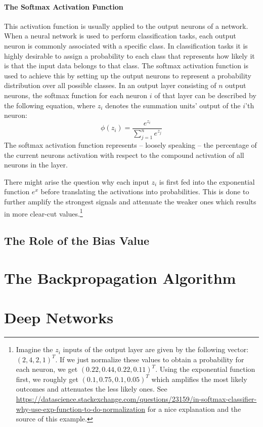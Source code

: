 \paragraph{The Softmax Activation Function}
This activation function is usually applied to the output neurons of
a network. When a neural network is used to perform classification
tasks, each output neuron is commonly associated with a specific
class. In classification tasks it is highly desirable to assign a
probability to each class that represents how likely it is that the
input data belongs to that class. The softmax activation function is
used to achieve this by setting up the output neurons to represent a
probability distribution over all possible classes.
In an output layer consisting of \(n\) output neurons, the softmax
function for each neuron \(i\) of that layer can be described by the
following equation, where \(z_i\) denotes the summation units' output of
the \(i\)'th neuron:
\begin{equation}
  \phi(z_i) = \frac{e^{z_i}}{\sum_{j=1}^{n}{e^{z_j}}}
\end{equation}
The softmax activation function represents -- loosely speaking -- the
percentage of the current neurons activation with respect to the compound
activation of all neurons in the layer.

There might arise the question why each input \(z_i\) is first fed
into the exponential function \(e^x\) before translating the
activations into probabilities. This is done to further amplify the
strongest signals and attenuate the weaker ones which results in more
clear-cut values.\footnote{Imagine the \(z_i\) inputs of the output
  layer are given by the following vector: \((2, 4, 2, 1)^T\). If we
  just normalize these values to obtain a probability for each neuron,
  we get \((0.22, 0.44, 0.22, 0.11)^T\). Using the exponential
  function first, we roughly get \((0.1, 0.75, 0.1, 0.05)^T\) which
  amplifies the most likely outcomes and attenuates the less likely
  ones. See
  \url{https://datascience.stackexchange.com/questions/23159/in-softmax-classifier-why-use-exp-function-to-do-normalization}
  for a nice explanation and the source of this example.}

\subsection{The Role of the Bias Value}

\section{The Backpropagation Algorithm}

\section{Deep Networks}
